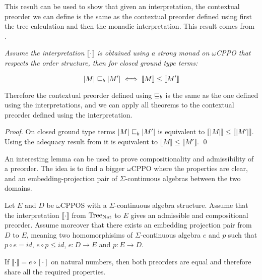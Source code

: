 This result can be used to show that given an interpretation,
the contextual preorder we can define is the same as 
the contextual preorder defined using first the tree
calculation and then the monadic interpretation. This 
result comes from \cite{plotkin2001adequacy}.

\begin{corollary}
    \em
    Assume the interpretation $\llbracket \cdot \rrbracket$ 
    is obtained using a strong monad on $\omega$CPPO that 
    respects the order structure, then for closed ground 
    type terms:

    \begin{equation*}
        |M| \sqsubseteq_b |M'| \iff \llbracket M \rrbracket \leq \llbracket M' \rrbracket
    \end{equation*}

    Therefore the contextual preorder defined using $\sqsubseteq_b$
    is the same as the one defined using the interpretations, and 
    we can apply all theorems to the contextual preorder defined 
    using the interpretation.
\end{corollary}

\begin{proof}
    On closed ground type terms $|M| \sqsubseteq_b |M'|$ is equivalent 
    to $\llbracket |M| \rrbracket \leq \llbracket |M'| \rrbracket$.
    Using the adequacy result from \cite{plotkin2001adequacy} 
    it is equivalent to $\llbracket M \rrbracket \leq \llbracket M' \rrbracket$.
\qed\end{proof}

An interesting lemma can be used to prove compositionality 
and admissibility of a preorder. The idea is to find a 
bigger $\omega$CPPO where the properties are clear, and 
an embedding-projection pair of $\Sigma$-continuous 
algebras between the two domains. 

\begin{lemma}
    Let $E$ and $D$ be $\omega$CPPOS with a $\Sigma$-continuous
    algebra structure. Assume that 
    the interpretation $\llbracket \cdot \rrbracket$ from $\textnormal{Tree}_{\textnormal{Nat}}$ to $E$
    gives an admissible and compositional preorder. 
    Assume moreover that there exists
    an embedding projection pair from $D$ to $E$,
    meaning two homomorphisims of $\Sigma$-continuous algebra 
    $e$ and $p$ such that $p \circ e = id$, $e \circ p \leq id$, 
    $e: D \to E$ and $p : E \to D$.

    If $\llbracket \cdot \rrbracket = e \circ [ \cdot ]$ on natural 
    numbers, then both preorders are equal and therefore share all 
    the required properties.
\end{lemma}

